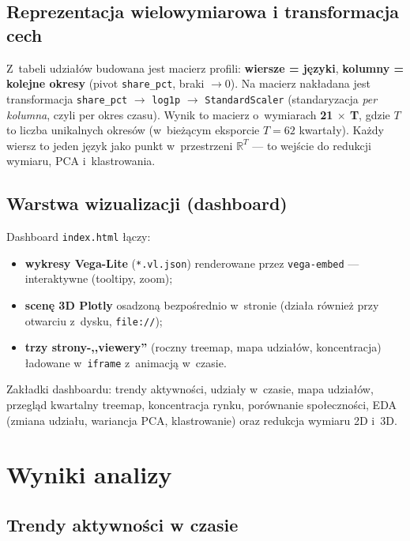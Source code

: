 \documentclass[11pt,a4paper]{article}
\begin{document}
\subsection{Reprezentacja wielowymiarowa i transformacja cech}

Z~tabeli udziałów budowana jest macierz profili: \textbf{wiersze = języki},
\textbf{kolumny = kolejne okresy} (pivot \texttt{share\_pct}, braki $\rightarrow 0$).
Na macierz nakładana jest transformacja \texttt{share\_pct} $\rightarrow$ \texttt{log1p}
$\rightarrow$ \texttt{StandardScaler} (standaryzacja \emph{per kolumna}, czyli per okres
czasu). Wynik to macierz o~wymiarach \textbf{21 $\times$ T}, gdzie $T$ to liczba unikalnych
okresów (w~bieżącym eksporcie $T = 62$ kwartały). Każdy wiersz to jeden język jako punkt
w~przestrzeni $\mathbb{R}^{T}$ --- to wejście do redukcji wymiaru, PCA i~klastrowania.

\subsection{Warstwa wizualizacji (dashboard)}

Dashboard \texttt{index.html} łączy:
\begin{itemize}[nosep]
  \item \textbf{wykresy Vega-Lite} (\texttt{*.vl.json}) renderowane przez \texttt{vega-embed} --- interaktywne (tooltipy, zoom);
  \item \textbf{scenę 3D Plotly} osadzoną bezpośrednio w~stronie (działa również przy otwarciu z~dysku, \texttt{file://});
  \item \textbf{trzy strony-,,viewery''} (roczny treemap, mapa udziałów, koncentracja) ładowane w~\texttt{iframe} z~animacją w~czasie.
\end{itemize}

Zakładki dashboardu: trendy aktywności, udziały w~czasie, mapa udziałów, przegląd kwartalny
treemap, koncentracja rynku, porównanie społeczności, EDA (zmiana udziału, wariancja PCA,
klastrowanie) oraz redukcja wymiaru 2D i~3D.

\section{Wyniki analizy}

\subsection{Trendy aktywności w czasie}
\end{document}
